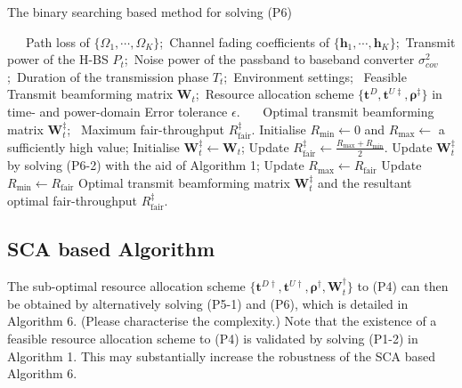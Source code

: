 \documentclass[12pt,draft,onecolumn,journal]{IEEEtran}
\begin{document}
\begin{algorithm}[!t]
	\caption{The binary searching based method for solving (P6)}
	\footnotesize
	\begin{algorithmic}[1]
		\REQUIRE ~~\
		Path loss of $\{\Omega_1,\cdots,\Omega_K\}$;\
		Channel fading coefficients of $\{\mathbf{h}_1,\cdots,\mathbf{h}_K\}$;\
		Transmit power of the H-BS $P_{t}$;\		
		Noise power of the passband to baseband converter $\sigma^2_{cov}$;\
		Duration of the transmission phase $T_t$;\
		Environment settings; \
		Feasible Transmit beamforming matrix $\mathbf{W}_t$;\
		Resource allocation scheme $\{\mathbf{t}^{D}, \mathbf{t}^{U\ddagger}, \boldsymbol{\rho}^{\ddagger}\}$ in time- and power-domain
		Error tolerance $\epsilon$.
		\ENSURE ~~\
		Optimal transmit beamforming matrix $\mathbf{W}_t^{\ddagger}$; \
		Maximum fair-throughput $R_{\text{fair}}^{\ddagger}$.
		\STATE Initialise $R_{\min}\leftarrow 0$ and $R_{\max}\leftarrow$ a sufficiently high value;
		\STATE Initialise $\mathbf{W}_t^{\ddagger} \leftarrow \mathbf{W}_t$;
			\STATE Update $R_{\text{fair}}^{\ddagger} \leftarrow \frac{R_{\max} + R_{\min}}{2}$.
			\STATE Update $\mathbf{W}_t^{\ddagger}$ by solving (P6-2) with the aid of Algorithm 1;
			\IF {$\text{Tr}(\mathbf{W}_t^{\ddagger}) > 1$}
				\STATE Update $R_{\max} \leftarrow R_{\text{fair}}$
			\ELSE
				\STATE Update $R_{\min} \leftarrow R_{\text{fair}}$
			\ENDIF
		\ENDWHILE
		\RETURN Optimal transmit beamforming matrix $\mathbf{W}_t^{\ddagger}$ and the resultant optimal fair-throughput $R_{\text{fair}}^{\ddagger}$.
	\end{algorithmic}
\end{algorithm}

\subsection{SCA based Algorithm}

The sub-optimal resource allocation scheme $\{\mathbf{t}^{D\dagger}, \mathbf{t}^{U\dagger}, \boldsymbol{\rho}^{\dagger}, \mathbf{W}_t^{\dagger}\}$ to (P4) can then be obtained by alternatively solving (P5-1) and (P6), which is detailed in Algorithm 6. {\color{red} (Please characterise the complexity.)}  Note that the existence of a feasible resource allocation scheme to (P4) is validated by solving (P1-2) in Algorithm 1. This may substantially increase the robustness of the SCA based Algorithm 6.
\end{document}

